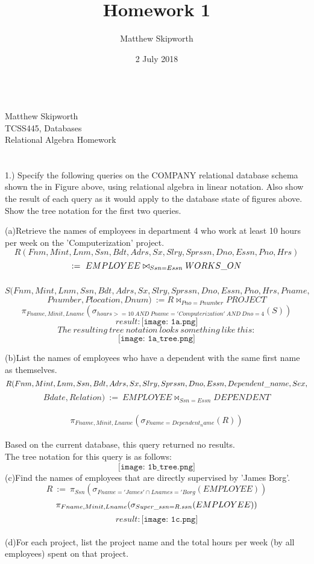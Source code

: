 \documentclass[paper=a4, fontsize=11pt]{scrartcl}
\title{Homework 1}
\author{Matthew Skipworth}
\date{2 July 2018}
\begin{document}
\ \\
Matthew Skipworth\\
TCSS445, Databases\\
Relational Algebra Homework\\ \\ \\
1.) Specify the following queries on the COMPANY relational database schema shown the in Figure above, using relational algebra in linear notation. Also show the result of each query as it would apply to the database state of figures above. Show the tree notation for the first two queries.

(a)Retrieve the names of employees in department 4 who work at least 10 hours per week on the 'Computerization' project.\\ 
$$R(Fnm, Mint, Lnm, Ssn, Bdt, Adrs, Sx, Slry, Sprssn, Dno,Essn,Pno,Hrs)$$ $$:=\ EMPLOYEE \bowtie_{Ssn=Essn} WORKS\char`_ON$$ \\ $$S(Fnm, Mint, Lnm, Ssn, Bdt, Adrs, Sx, Slry, Sprssn, Dno,Essn,Pno,Hrs,Pname,$$ $$Pnumber,Plocation,Dnum)\ := R \bowtie _{Pno=Pnumber} PROJECT$$
$$\pi_{Fname,Minit,Lname}(\sigma_{hours>=10\ AND\ Pname='Computerization'\ AND\ Dno=4}(S))$$
$$result: \texttt{[image: 1a.png]}$$
$$The\ resulting\ tree\ notation\ looks\ something\ like\ this:$$
$$\texttt{[image: 1a\_tree.png]}$$


(b)List the names of employees who have a dependent with the same first name as themselves.
$$R (Fnm, Mint, Lnm, Ssn, Bdt, Adrs, Sx, Slry, Sprssn, Dno,Essn,Dependent \char`_ name,Sex,$$ $$Bdate,Relation)\ :=\ EMPLOYEE \bowtie_{Ssn=Essn}DEPENDENT$$ \\
$$\pi_{Fname, Minit, Lname}(\sigma_{Fname=Dependent_name}(R))$$\\
Based on the current database, this query returned no results.\\
The tree notation for this query is as follows:
$$\texttt{[image: 1b\_tree.png]}$$ 
(c)Find the names of employees that are directly supervised by 'James Borg'.
$$R\ :=\ \pi_{Ssn}(\sigma_{Fname='James' \cap Lnames='Borg}(EMPLOYEE))$$
$$\pi_{Fname,Minit,Lname}(\sigma_{Super \char`_ssn=R.ssn}(EMPLOYEE))$$
$$result: \texttt{[image: 1c.png]}$$\\
(d)For each project, list the project name and the total hours per week (by all employees) spent on that project.
\end{document}
